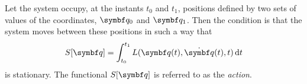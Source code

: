 Let the system occupy, at the instants \(t_0\) and \(t_1\), positions defined by two sets of values of the coordinates,
\(\vct{q}_0\) and \(\vct{q}_1\). Then the condition is that the system moves between these positions in such a way that
\[
  S[\vct{q}] = \int_{t_0}^{t_1} L(\vct{q}(t), \dot{\vct{q}}(t), t) \diff t
\]
is stationary. The functional \(S[\vct{q}]\) is referred to as the \emph{action}.

\Edc
